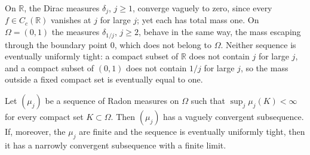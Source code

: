 \begin{example}\label{ex:escaping-mass}
On $\mathbb R$, the Dirac measures $\delta_j$, $j\geq1$, converge vaguely to zero, since every $f\in C_c(\mathbb R)$ vanishes at $j$ for large $j$; yet each has total mass one. On $\Omega=(0,1)$ the measures $\delta_{1/j}$, $j\geq2$, behave in the same way, the mass escaping through the boundary point $0$, which does not belong to $\Omega$. Neither sequence is eventually uniformly tight: a compact subset of $\mathbb R$ does not contain $j$ for large $j$, and a compact subset of $(0,1)$ does not contain $1/j$ for large $j$, so the mass outside a fixed compact set is eventually equal to one.
\end{example}

\begin{theorem}\label{thm:local-measure-selection}
Let $(\mu_j)$ be a sequence of Radon measures on $\Omega$ such that $\sup_j\mu_j(K)<\infty$ for every compact set $K\subset\Omega$. Then $(\mu_j)$ has a vaguely convergent subsequence. If, moreover, the $\mu_j$ are finite and the sequence is eventually uniformly tight, then it has a narrowly convergent subsequence with a finite limit.
\end{theorem}
